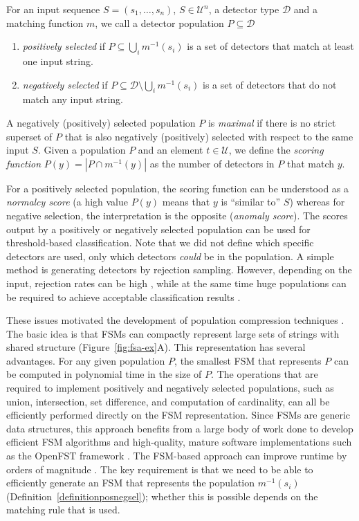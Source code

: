 \documentclass{llncs}
\begin{document}
\begin{definition}
For an input sequence  $S=(s_1,\ldots,s_n)$, $S \in \mathcal{U}^n$,
a detector type $\mathcal{D}$ and a matching function $m$,  we call a 
detector population $P \subseteq \mathcal{D}$
\begin{enumerate}
\item \emph{positively selected} if $P \subseteq \bigcup_i m^{-1}(s_i)$ is a set of detectors 
that match at least one input string.
\item \emph{negatively selected} if $P \subseteq \mathcal{D} \setminus \bigcup_i m^{-1}(s_i)$ 
is a set of detectors that do not match any input string. 
\end{enumerate}

A negatively (positively) selected population $P$ is \emph{maximal} if there is no strict superset of $P$ that is also negatively (positively) selected with respect to the same input $S$. Given a population $P$ and an element $t \in \mathcal{U}$, we define the \emph{scoring function} $P(y) =  |P \cap m^{-1}(y)|$ as the number of detectors in $P$ that match $y$. 
\label{definitionposnegsel} %
\end{definition}

For a positively selected population, the scoring function can be understood as a \emph{normalcy score} (a high value $P(y)$ means that $y$ is ``similar to'' $S$) whereas for negative selection, the interpretation is the opposite (\emph{anomaly score}). The scores output by a positively or negatively selected population can be used for threshold-based classification. Note that we did not define which specific detectors are used, only which detectors \emph{could} be in the population. A simple method is generating detectors by rejection sampling. However, depending on the input, rejection rates can be high \cite{Dhaeseleer1996,Dhaeseleer1996b}, while at the same time huge populations can be required to achieve acceptable classification results %
\cite{Stibor2005}. 

These issues motivated the development of population compression 
techniques \cite{Elberfeld_2009,Elberfeld2011}.
The basic idea is that FSMs can compactly represent large sets of strings with 
shared structure (Figure~\ref{fig:fsa-ex}A). This representation has several advantages.
For any given population $P$, the smallest FSM that represents $P$ can be computed in polynomial time in the 
size of $P$. The operations that are required to implement positively and negatively selected populations,
such as union, intersection, set difference, and computation of cardinality, can all be efficiently performed directly 
on the FSM representation.  Since FSMs are generic data structures, this approach benefits 
from a large body of work done to develop efficient FSM algorithms and high-quality, mature software implementations 
such as the OpenFST framework \cite{openfst}. 
The FSM-based approach can improve runtime by orders of 
magnitude \cite{Textor2012,Textor2014}. The key requirement is that we need to be able to efficiently generate
an FSM that represents the population $m^{-1}(s_i)$ (Definition~\ref{definitionposnegsel}); whether this is possible
depends on the matching rule that is used.
\end{document}
